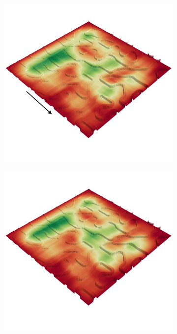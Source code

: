 \documentclass[../document.tex]{subfiles}
\begin{document}
\begin{figure}[H]
\begin{subfigure}[b]{0.45\textwidth}
  \end{subfigure}
  \begin{subfigure}[b]{0.45\textwidth}
    \includegraphics[width=\linewidth]{../img/4/traversability/bars/-0.png}
  \end{subfigure}
  \begin{subfigure}[b]{0.45\textwidth}
      \includegraphics[width=\linewidth]{../img/4/traversability/bars/-180.png}  

\end{subfigure}
\end{figure}
\end{document}
